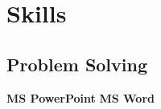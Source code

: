 \documentclass[]{kajalverse-resume}
\begin{document}
\begin{minipage}[t]{0.33\textwidth}






\section{Skills}
{\subsection{Problem Solving}}
{\textbf{MS PowerPoint} \textbullet{} \textbf{MS Word}}

\end{minipage}
\end{document}
